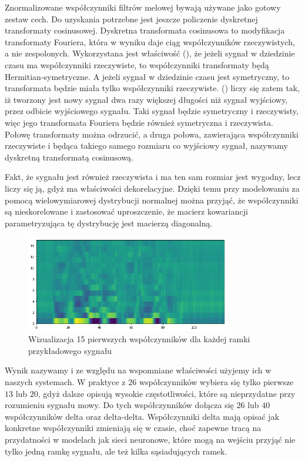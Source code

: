 Znormalizowane współczynniki filtrów melowej bywają używane jako gotowy zestaw cech. Do uzyskania 
potrzebne jest jeszcze policzenie dyskretnej transformaty cosinusowej. Dyskretna transformata cosinusowa to modyfikacja
transformaty Fouriera, która w wyniku daje ciąg współczynników rzeczywistych, a nie zespolonych. Wykorzystana jest
właściwość  (), że jeżeli sygnał w dziedzinie czasu ma
współczynniki rzeczywiste, to współczynniki transformaty
będą Hermitian-symetryczne. A jeżeli sygnał w dziedzinie czasu jest symetryczny, to transformata będzie miała
tylko współczynniki rzeczywiste.  () liczy się zatem tak,
iż tworzony jest nowy sygnał dwa razy większej długości niż
sygnał wyjściowy, przez odbicie wyjściowego sygnału. Taki sygnał będzie symetryczny i rzeczywisty, więc jego transformata
Fouriera będzie również symetryczna i rzeczywista. Połowę transformaty można odrzucić, a druga połowa, zawierająca
współczynniki rzeczywiste i będąca takiego samego rozmiaru co wyjściowy sygnał, nazywamy dyskretną transformatą cosinusową.

Fakt, że  sygnału jest również rzeczywista i ma ten sam rozmiar jest wygodny, lecz liczy się ją,
gdyż ma właściwości dekorelacyjne. Dzięki temu przy modelowaniu  za pomocą wielowymiarowej
dystrybucji normalnej można przyjąć, że
współczynniki są nieskorelowane i zastosować uproszczenie, że macierz kowariancji parametryzująca tę dystrybucję
jest macierzą diagonalną.

\begin{figure}[H]
    \centering
    \includegraphics[width=0.8\textwidth]{images/2_1_e_mfcc}
    \caption{Wizualizacja 15 pierwszych współczynników  dla każdej ramki przykładowego sygnału}
    \label{fig:2_1_e_mfcc}
\end{figure}

Wynik  nazywamy  i ze względu na wspomniane właściwości użyjemy ich
w naszych systemach. W praktyce z $26$ współczynników wybiera się tylko pierwsze $13$ lub $20$, gdyż dalsze opisują
wysokie częstotliwości, które są nieprzydatne przy rozumieniu sygnału mowy. Do tych współczynników dołącza się $26$ lub $40$
współczynników delta oraz delta-delta. Współczynniki delta mają opisać jak konkretne współczynniki zmieniają się w czasie,
choć zapewne tracą na przydatności w modelach jak sieci neuronowe, które mogą na wejściu przyjąć nie tylko jedną ramkę sygnału,
ale też kilka sąsiadujących ramek.

